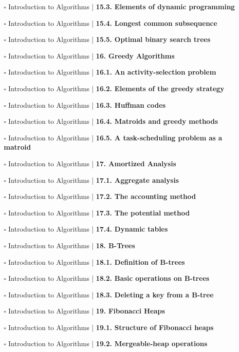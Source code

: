 \documentclass[a4, landscape, 12pt]{article}
\newcommand{\checkbox}{$\square$}%
\begin{document}
\begin{itemize}
{}
\item [\checkbox]  Introduction to Algorithms | \textbf{ 15.3. Elements of dynamic programming
}
\item [\checkbox]  Introduction to Algorithms | \textbf{ 15.4. Longest common subsequence
}
\item [\checkbox]  Introduction to Algorithms | \textbf{ 15.5. Optimal binary search trees
}
\item [\checkbox]  Introduction to Algorithms | \textbf{ 16. Greedy Algorithms
}
\item [\checkbox]  Introduction to Algorithms | \textbf{ 16.1. An activity-selection problem
}
\item [\checkbox]  Introduction to Algorithms | \textbf{ 16.2. Elements of the greedy strategy
}
\item [\checkbox]  Introduction to Algorithms | \textbf{ 16.3. Huffman codes
}
\item [\checkbox]  Introduction to Algorithms | \textbf{ 16.4. Matroids and greedy methods
}
\item [\checkbox]  Introduction to Algorithms | \textbf{ 16.5. A task-scheduling problem as a matroid
}
\item [\checkbox]  Introduction to Algorithms | \textbf{ 17. Amortized Analysis
}
\item [\checkbox]  Introduction to Algorithms | \textbf{ 17.1. Aggregate analysis
}
\item [\checkbox]  Introduction to Algorithms | \textbf{ 17.2. The accounting method
}
\item [\checkbox]  Introduction to Algorithms | \textbf{ 17.3. The potential method
}
\item [\checkbox]  Introduction to Algorithms | \textbf{ 17.4. Dynamic tables
}
\item [\checkbox]  Introduction to Algorithms | \textbf{ 18. B-Trees
}
\item [\checkbox]  Introduction to Algorithms | \textbf{ 18.1. Definition of B-trees
}
\item [\checkbox]  Introduction to Algorithms | \textbf{ 18.2. Basic operations on B-trees
}
\item [\checkbox]  Introduction to Algorithms | \textbf{ 18.3. Deleting a key from a B-tree
}
\item [\checkbox]  Introduction to Algorithms | \textbf{ 19. Fibonacci Heaps
}
\item [\checkbox]  Introduction to Algorithms | \textbf{ 19.1. Structure of Fibonacci heaps
}
\item [\checkbox]  Introduction to Algorithms | \textbf{ 19.2. Mergeable-heap operations
}
\end{itemize}
\end{document}
